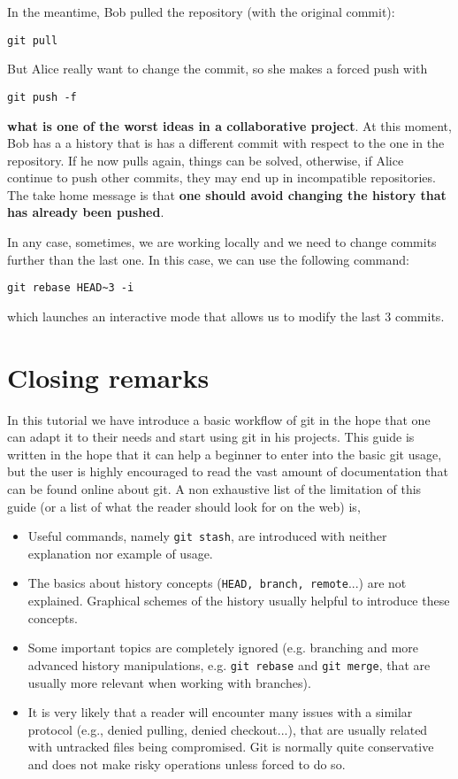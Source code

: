 \documentclass[a4paper,10pt]{article}
\begin{document}
In the meantime, Bob pulled the repository (with the original commit):

\begin{lstlisting}[style=Bob]
 git pull
\end{lstlisting}

But Alice really want to change the commit, so she makes a forced push with

\begin{lstlisting}[style=Alice]
 git push -f
\end{lstlisting}
\textbf{what is one of the worst ideas in a collaborative project}. At this moment, Bob has a a history that is has a different commit with respect to the one in the repository. If he now pulls again, things can be solved, otherwise, if Alice continue to push other commits, they may end up in incompatible repositories. The take home message is that \textbf{one should avoid changing the history that has already been pushed}.

In any case, sometimes, we are working locally and we need to change commits further than the last one. In this case, we can use the following command:

\begin{lstlisting}[style=Alice]
 git rebase HEAD~3 -i
\end{lstlisting}
which launches an interactive mode that allows us to modify the last 3 commits. 

\clearpage

\section{Closing remarks}

In this tutorial we have introduce a basic workflow of git in the hope that one can adapt it to their needs and start using git in his projects. This guide is written in the hope that it can help a beginner to enter into the basic git usage, but the user is highly encouraged to read the vast amount of documentation that can be found online about git. A non exhaustive list of the limitation of this guide (or a list of what the reader should look for on the web) is,

\begin{itemize}
 \item Useful commands, namely \texttt{git stash}, are introduced with neither explanation nor example of usage.
 \item The basics about history concepts (\texttt{HEAD, branch, remote}...) are not explained. Graphical schemes of the history usually helpful to introduce these concepts.
 \item Some important topics are completely ignored (e.g. branching and more advanced history manipulations, e.g. \texttt{git rebase} and \texttt{git merge}, that are usually more  relevant when working with branches).
 \item It is very likely that a reader will encounter many issues with a similar protocol (e.g., denied pulling, denied checkout...), that are usually related with untracked files being compromised. Git is normally quite conservative and does not make risky operations unless forced to do so.
\end{itemize}
\end{document}

